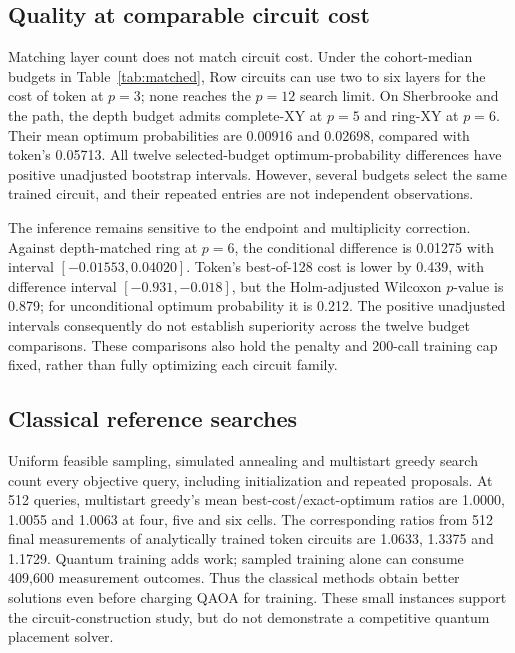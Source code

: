 \documentclass[manuscript,screen,review]{acmart}
\begin{document}
\subsection{Quality at comparable circuit cost}
\begin{table}[t]\centering\small\setlength{\tabcolsep}{3pt}
\caption{Quality at measured cohort-median budgets on twelve four-cell/six-site transfer
instances. Used is the selected Row cost divided by token's cost, using the
cohort median of five-seed instance medians. Quality averages three starts and
two optimizer seeds within instance. Positive optimum-probability differences favor
token; intervals are paired, family-stratified bootstrap 95\% intervals.
The artifact includes conditional quality, best-of-128 cost, legal probability and
Holm-corrected tests for all twelve resource selections.}
\label{tab:matched}
\end{table}

Matching layer count does not match circuit cost. Under the cohort-median
budgets in Table~\ref{tab:matched}, Row circuits can use two to six layers
for the cost of token at $p=3$; none reaches the $p=12$ search limit.
On Sherbrooke and the path, the depth budget admits complete-XY at $p=5$
and ring-XY at $p=6$. Their mean optimum probabilities are 0.00916 and
0.02698, compared with token's 0.05713. All twelve selected-budget
optimum-probability differences have positive unadjusted bootstrap
intervals. However, several budgets select the same trained circuit,
and their repeated entries are not independent observations.

The inference remains sensitive to the endpoint and multiplicity correction.
Against depth-matched ring at $p=6$, the conditional difference is 0.01275
with interval $[-0.01553,0.04020]$. Token's best-of-128 cost is lower by
0.439, with difference interval $[-0.931,-0.018]$, but the Holm-adjusted
Wilcoxon $p$-value is 0.879; for unconditional optimum probability it is
0.212. The positive unadjusted intervals consequently do not establish
superiority across the twelve budget comparisons. These comparisons also
hold the penalty and 200-call training cap fixed, rather than fully
optimizing each circuit family.

\subsection{Classical reference searches}
Uniform feasible sampling, simulated annealing and multistart greedy
search count every objective query, including initialization and repeated
proposals. At 512 queries, multistart greedy's mean best-cost/exact-optimum
ratios are 1.0000, 1.0055 and 1.0063 at four, five and six cells. The
corresponding ratios from 512 final measurements of analytically trained
token circuits are 1.0633, 1.3375 and 1.1729. Quantum training adds work;
sampled training alone can consume 409,600 measurement outcomes. Thus the
classical methods obtain better solutions even before charging QAOA for
training. These small instances support the circuit-construction study,
but do not demonstrate a competitive quantum placement solver.
\end{document}
